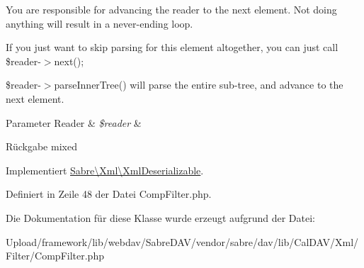 You are responsible for advancing the reader to the next element. Not doing anything will result in a never-\/ending loop.

If you just want to skip parsing for this element altogether, you can just call \$reader-\/$>$next();

\$reader-\/$>$parse\+Inner\+Tree() will parse the entire sub-\/tree, and advance to the next element.


\begin{DoxyParams}[1]{Parameter}
Reader & {\em \$reader} & \\
\hline
\end{DoxyParams}
\begin{DoxyReturn}{Rückgabe}
mixed 
\end{DoxyReturn}


Implementiert \mbox{\hyperlink{interface_sabre_1_1_xml_1_1_xml_deserializable_a19e0eca545b9a0d93f7d6b69085ade30}{Sabre\textbackslash{}\+Xml\textbackslash{}\+Xml\+Deserializable}}.



Definiert in Zeile 48 der Datei Comp\+Filter.\+php.



Die Dokumentation für diese Klasse wurde erzeugt aufgrund der Datei\+:\begin{DoxyCompactItemize}
\item 
Upload/framework/lib/webdav/\+Sabre\+D\+A\+V/vendor/sabre/dav/lib/\+Cal\+D\+A\+V/\+Xml/\+Filter/Comp\+Filter.\+php\end{DoxyCompactItemize}
